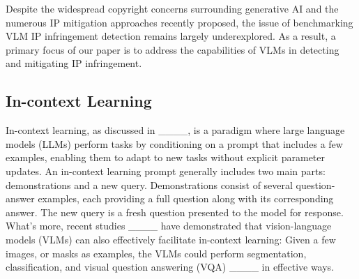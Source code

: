 Despite the widespread copyright concerns surrounding generative AI and the numerous IP mitigation approaches recently proposed, the issue of benchmarking VLM IP infringement detection remains largely underexplored. As a result, a primary focus of our paper is to address the capabilities of VLMs in detecting and mitigating IP infringement.

\subsection{In-context Learning}
In-context learning, as discussed in ____, is a paradigm where large language models (LLMs) perform tasks by conditioning on a prompt that includes a few examples, enabling them to adapt to new tasks without explicit parameter updates. An in-context learning prompt generally includes two main parts: demonstrations and a new query. Demonstrations consist of several question-answer examples, each providing a full question along with its corresponding answer. The new query is a fresh question presented to the model for response. What's more, recent studies ____ have demonstrated that vision-language models (VLMs) can also effectively facilitate in-context learning: Given a few images, or masks as examples, the VLMs could perform segmentation, classification, and visual question answering (VQA) ____ in effective ways. 

%